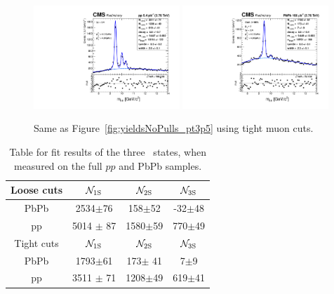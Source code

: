 \begin{figure}[h]
  \centering
\includegraphics[width=0.49\textwidth]{Chapters/aYield/pp/pt_4_4/Rap/Rap_0_2p4/pp2p76tev_Rap_0_2p4_fsr1_3Spositive.pdf}
\includegraphics[width=0.49\textwidth]{Chapters/aYield/PbPb/pt_4_4/Centrality/Cent_0_100/PbPb_Cent_0_100_fsr1_3Spositive.pdf}
\caption{\label{fig:yieldsNoPulls_pt4} Same as Figure~\ref{fig:yieldsNoPulls_pt3p5} using tight muon \pt cuts. }
\end{figure}
%
%
\begin{table}[h]
  \centering
    \begin{tabular}{c|c|c|c}
      Loose cuts
      & ${\cal N}_{\rm 1S}$ & ${\cal N}_{\rm 2S}$ & ${\cal N}_{\rm 3S}$\\
      \hline
      PbPb &2534$\pm$76&158$\pm$52&-32$\pm$48  \\ 
      pp   &5014 $\pm$ 87 & 1580$\pm$59&770$\pm$49\\ 
      \hline \hline
      Tight cuts
       & ${\cal N}_{\rm 1S}$ & ${\cal N}_{\rm 2S}$ & ${\cal N}_{\rm 3S}$\\
      \hline
      PbPb &1793$\pm$61&173$\pm$ 41& 7$\pm$9  \\ 
      pp   &3511 $\pm$ 71& 1208$\pm$49&619$\pm$41\\ 
      \hline
    \end{tabular}

\caption{Table for fit results of the three \PgU\ states, when
  measured on the full $pp$ and PbPb samples.} 
\label{tab:MinBiasTable}
\end{table}


